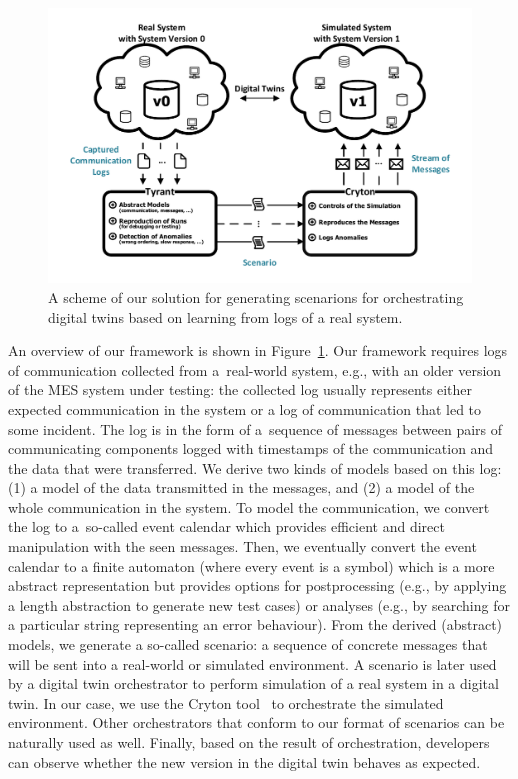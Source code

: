 {%
\begin{figure}[bt]
  \centering
  \includegraphics[scale=0.8]{figs/eurocast-diagram.pdf}
  \caption{A scheme of our solution for generating scenarions for orchestrating digital twins based on learning from logs of a real system.}
  \label{fig:tunis-diagram}
\end{figure}

An overview of our framework is shown in Figure~\ref{fig:tunis-diagram}.  
%
Our framework requires logs of communication collected from a~real-world
system, e.g., with an older version of the MES system under testing: the collected log
usually represents either expected communication in the system or a log of
communication that led to some incident.  
%
The log is in the form of a~sequence of messages between pairs of communicating
components logged with timestamps of the communication and the data that
were transferred.
%
We derive two kinds of models based on this log: (1) a model of the data
transmitted in the messages, and (2) a model of the whole communication in
the system.
%
To model the communication, we convert the log to a~so-called event calendar
which provides efficient and direct manipulation with the seen messages.
Then, we eventually convert the event calendar to a finite automaton (where
every event is a symbol) which is a more abstract representation but provides
options for postprocessing (e.g., by applying a length abstraction to generate
new test cases) or analyses (e.g., by searching for a particular string
representing an error behaviour).
%
From the derived (abstract) models, we generate a so-called scenario: a
sequence of concrete messages that will be sent into a real-world or simulated
environment. 
%
A scenario is later used by a digital twin orchestrator to perform simulation
of a real system in a digital twin.
%
In our case, we use the Cryton tool~\cite{ref_cryton} to orchestrate the simulated
environment. Other orchestrators that conform to our format of scenarios can be
naturally used as well. 
%
%
Finally, based on the result of orchestration, developers can observe whether
the new version in the digital twin behaves as expected.

}
